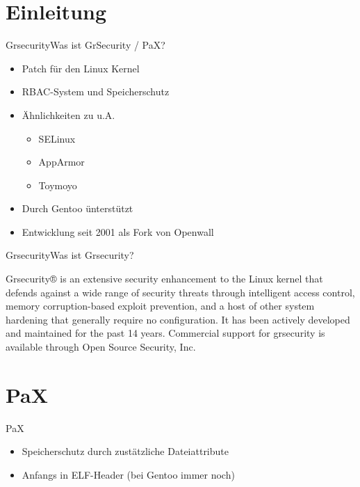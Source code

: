 

\mode*
\begin{frame}
    \titlepage
\end{frame}

\begin{frame}
    \tableofcontents
\end{frame}

\section{Einleitung}
\begin{frame}{Grsecurity}{Was ist GrSecurity / PaX?}
    \begin{itemize}
        \item Patch für den Linux Kernel
        \item RBAC-System und Speicherschutz
        \item Ähnlichkeiten zu u.A.
            \begin{itemize}
                \item SELinux
                \item AppArmor
                \item Toymoyo
            \end{itemize}
        \item Durch Gentoo ünterstützt
        \item Entwicklung seit 2001 als Fork von Openwall
    \end{itemize}
\end{frame}

\begin{frame}{Grsecurity}{Was ist Grsecurity?}
    \begin{Definition} %
        Grsecurity® is an extensive security enhancement to the Linux kernel that defends against a wide range of security threats through intelligent access control, memory corruption-based exploit prevention, and a host of other system hardening that generally require no configuration. It has been actively developed and maintained for the past 14 years. Commercial support for grsecurity is available through Open Source Security, Inc. \cite{grsechp}
    \end{Definition}
\end{frame}

\section{PaX}
\begin{frame}{PaX}
    \begin{itemize}
        \item Speicherschutz durch zustätzliche Dateiattribute
        \item Anfangs in ELF-Header (bei Gentoo immer noch)
    \end{itemize}
\end{frame}

